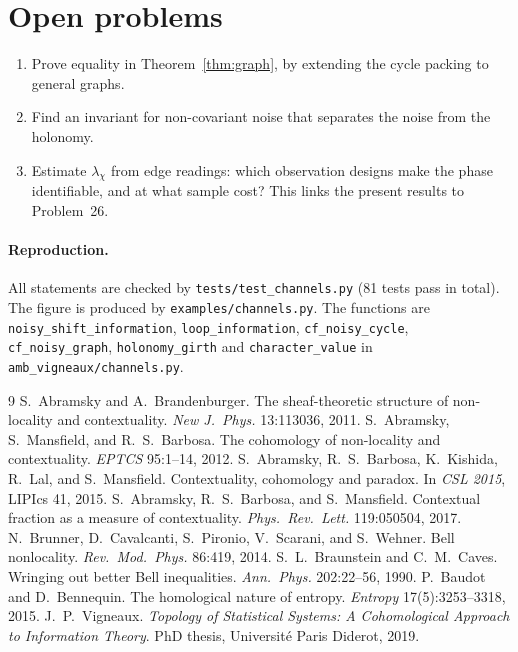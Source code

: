 \documentclass[11pt]{article}
\theoremstyle{definition}
\theoremstyle{remark}
\begin{document}
\section{Open problems}
\begin{enumerate}
  \item Prove equality in Theorem~\ref{thm:graph}, by extending the cycle packing to general graphs.
  \item Find an invariant for non-covariant noise that separates the noise from the holonomy.
  \item Estimate $\lambda_\chi$ from edge readings: which observation designs make the phase identifiable, and at what sample cost? This links the present results to Problem~26.
\end{enumerate}

\paragraph{Reproduction.} All statements are checked by \texttt{tests/test\_channels.py} (81 tests pass in total). The figure is produced by \texttt{examples/channels.py}. The functions are \texttt{noisy\_shift\_information}, \texttt{loop\_information}, \texttt{cf\_noisy\_cycle}, \texttt{cf\_noisy\_graph}, \texttt{holonomy\_girth} and \texttt{character\_value} in \texttt{amb\_vigneaux/channels.py}.

\begin{thebibliography}{9}
 S.~Abramsky and A.~Brandenburger. The sheaf-theoretic structure of non-locality and contextuality. \emph{New J.\ Phys.} 13:113036, 2011.
 S.~Abramsky, S.~Mansfield, and R.~S.~Barbosa. The cohomology of non-locality and contextuality. \emph{EPTCS} 95:1--14, 2012.
 S.~Abramsky, R.~S.~Barbosa, K.~Kishida, R.~Lal, and S.~Mansfield. Contextuality, cohomology and paradox. In \emph{CSL 2015}, LIPIcs 41, 2015.
 S.~Abramsky, R.~S.~Barbosa, and S.~Mansfield. Contextual fraction as a measure of contextuality. \emph{Phys.\ Rev.\ Lett.} 119:050504, 2017.
 N.~Brunner, D.~Cavalcanti, S.~Pironio, V.~Scarani, and S.~Wehner. Bell nonlocality. \emph{Rev.\ Mod.\ Phys.} 86:419, 2014.
 S.~L.~Braunstein and C.~M.~Caves. Wringing out better Bell inequalities. \emph{Ann.\ Phys.} 202:22--56, 1990.
 P.~Baudot and D.~Bennequin. The homological nature of entropy. \emph{Entropy} 17(5):3253--3318, 2015.
 J.~P.~Vigneaux. \emph{Topology of Statistical Systems: A Cohomological Approach to Information Theory}. PhD thesis, Universit\'e Paris Diderot, 2019.
\end{thebibliography}
\end{document}
